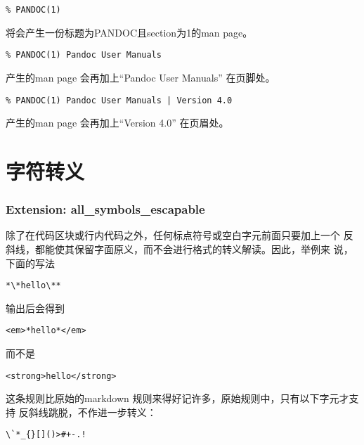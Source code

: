 \documentclass[fancyhdr,bookmark]{ctexbook}
\begin{document}
\begin{lstlisting}
% PANDOC(1)
\end{lstlisting}

将会产生一份标题为PANDOC且section为1的man page。

\begin{lstlisting}
% PANDOC(1) Pandoc User Manuals
\end{lstlisting}

产生的man page 会再加上``Pandoc User Manuals'' 在页脚处。

\begin{lstlisting}
% PANDOC(1) Pandoc User Manuals | Version 4.0
\end{lstlisting}

产生的man page 会再加上``Version 4.0'' 在页眉处。

\hypertarget{ux5b57ux7b26ux8f6cux4e49}{%
\section{字符转义}\label{ux5b57ux7b26ux8f6cux4e49}}

\hypertarget{extension-all_symbols_escapable}{%
\subsubsection{Extension:
all\_symbols\_escapable}\label{extension-all_symbols_escapable}}

除了在代码区块或行内代码之外，任何标点符号或空白字元前面只要加上一个
反斜线，都能使其保留字面原义，而不会进行格式的转义解读。因此，举例来
说，下面的写法

\begin{lstlisting}
*\*hello\**
\end{lstlisting}

输出后会得到

\begin{lstlisting}
<em>*hello*</em>
\end{lstlisting}

而不是

\begin{lstlisting}
<strong>hello</strong>
\end{lstlisting}

这条规则比原始的markdown
规则来得好记许多，原始规则中，只有以下字元才支持
反斜线跳脱，不作进一步转义：

\begin{lstlisting}
\`*_{}[]()>#+-.!
\end{lstlisting}
\end{document}
